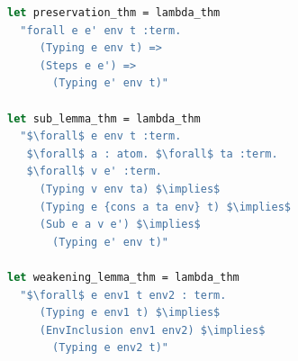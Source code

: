 \documentclass[aspectratio=169]{beamer}
\renewcommand{\it}[1]{\textit{#1}}
\begin{document}
\begin{frame}[fragile]
\begin{lstlisting}[mathescape,language=OCaml,escapebegin=\color{codepurple}]
let preservation_thm = lambda_thm
  "forall e e' env t :term.
     (Typing e env t) =>
     (Steps e e') =>
       (Typing e' env t)"

let sub_lemma_thm = lambda_thm
  "$\forall$ e env t :term.
   $\forall$ a : atom. $\forall$ ta :term.
   $\forall$ v e' :term.
     (Typing v env ta) $\implies$
     (Typing e {cons a ta env} t) $\implies$
     (Sub e a v e') $\implies$
       (Typing e' env t)"

let weakening_lemma_thm = lambda_thm
  "$\forall$ e env1 t env2 : term.
     (Typing e env1 t) $\implies$
     (EnvInclusion env1 env2) $\implies$
       (Typing e env2 t)"
\end{lstlisting}
\end{frame}

\begin{frame}
\frametitle{ }
\centering{
  \it{\huge Koniec}
}
\end{frame}
\end{document}
